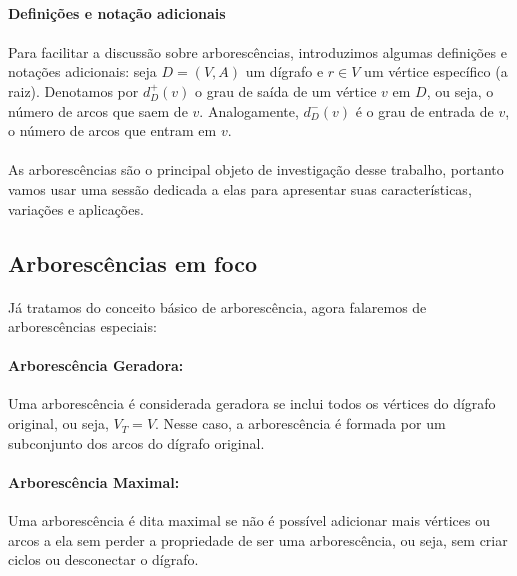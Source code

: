 \documentclass[12pt,a4paper]{article}
\begin{document}
\paragraph{Definições e notação adicionais}
\paragraph{}
Para facilitar a discussão sobre arborescências, introduzimos algumas definições e notações adicionais: seja \(D = (V, A)\) um dígrafo e \(r \in V\) um vértice específico (a raiz). Denotamos por \(d_D^+(v)\) o grau de saída de um vértice \(v\) em \(D\), ou seja, o número de arcos que saem de \(v\). Analogamente, \(d_D^-(v)\) é o grau de entrada de \(v\), o número de arcos que entram em \(v\).


\paragraph{}
As arborescências são o principal objeto de investigação desse trabalho, portanto vamos usar uma sessão dedicada a elas para apresentar suas características, variações e aplicações.

\subsection{Arborescências em foco}

\paragraph{}
Já tratamos do conceito básico de arborescência, agora falaremos de arborescências especiais:

\paragraph{Arborescência Geradora:}
Uma arborescência é considerada geradora se inclui todos os vértices do dígrafo original, ou seja, \(V_T = V\). Nesse caso, a arborescência é formada por um subconjunto dos arcos do dígrafo original.

\paragraph{Arborescência Maximal:}
Uma arborescência é dita maximal se não é possível adicionar mais vértices ou arcos a ela sem perder a propriedade de ser uma arborescência, ou seja, sem criar ciclos ou desconectar o dígrafo.
\end{document}
